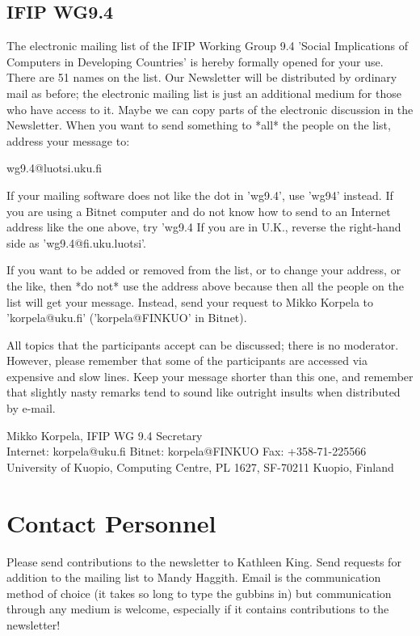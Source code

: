 \subsection{IFIP WG9.4}

The electronic mailing list of the IFIP Working Group 9.4
'Social Implications of Computers in Developing Countries' is hereby
formally opened for your use. There are 51 names on the list. Our
Newsletter will be distributed by ordinary mail as before; the
electronic mailing list is just an additional medium for those who
have access to it. Maybe we can copy parts of the electronic
discussion in the Newsletter. When you want to send something to *all* the people on the list, address your message to:

    wg9.4@luotsi.uku.fi

If your mailing software does not like the dot in 'wg9.4', use 'wg94'
instead. If you are using a Bitnet computer and do not know how to send
to an Internet address like the one above, try 'wg9.4%
If you are in U.K., reverse the right-hand side as 'wg9.4@fi.uku.luotsi'.

If you want to be added or removed from the list, or to change your address,
or the like, then *do not* use the address above because then all the
people on the list will get your message.  Instead, send your request to
Mikko Korpela to 'korpela@uku.fi' ('korpela@FINKUO' in Bitnet).

All topics that the participants accept can be discussed; there is no
moderator. However, please remember that some of the participants are
accessed via expensive and slow lines. Keep your message shorter than this
one, and remember that slightly nasty remarks tend to sound like outright
insults when distributed by e-mail.

Mikko Korpela, IFIP WG 9.4 Secretary   \\
Internet: korpela@uku.fi   Bitnet: korpela@FINKUO   Fax: +358-71-225566\\
University of Kuopio, Computing Centre, PL 1627, SF-70211 Kuopio, Finland

\section{Contact Personnel}
Please send contributions to the newsletter to Kathleen King. Send
requests for addition to the mailing list to Mandy Haggith. Email is
the communication method of choice 
(it takes so long to type the gubbins in) but communication through any
medium is welcome, especially if it contains contributions to the
newsletter!

